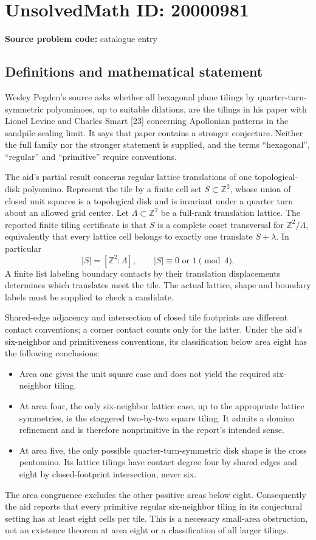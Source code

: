 \documentclass[11pt]{article}
\newcommand{\Z}{\mathbb{Z}}
\begin{document}
\section*{UnsolvedMath ID: 20000981}
\textbf{Source problem code:} catalogue entry
\subsection{Definitions and mathematical statement}
Wesley Pegden's source asks whether all hexagonal plane tilings by quarter-turn-symmetric polyominoes, up to suitable dilations, are the tilings in his paper with Lionel Levine and Charles Smart [23] concerning Apollonian patterns in the sandpile scaling limit. It says that paper contains a stronger conjecture. Neither the full family nor the stronger statement is supplied, and the terms ``hexagonal'', ``regular'' and ``primitive'' require conventions.

The aid's partial result concerns regular lattice translations of one topological-disk polyomino. Represent the tile by a finite cell set $S\subset\Z^2$, whose union of closed unit squares is a topological disk and is invariant under a quarter turn about an allowed grid center. Let $\Lambda\subset\Z^2$ be a full-rank translation lattice. The reported finite tiling certificate is that $S$ is a complete coset transversal for $\Z^2/\Lambda$, equivalently that every lattice cell belongs to exactly one translate $S+\lambda$. In particular
\[
 |S|=[\Z^2:\Lambda],\qquad |S|\equiv0\text{ or }1\pmod4.
\]
A finite list labeling boundary contacts by their translation displacements determines which translates meet the tile. The actual lattice, shape and boundary labels must be supplied to check a candidate.

Shared-edge adjacency and intersection of closed tile footprints are different contact conventions; a corner contact counts only for the latter. Under the aid's six-neighbor and primitiveness conventions, its classification below area eight has the following conclusions:
\begin{itemize}
\item Area one gives the unit square case and does not yield the required six-neighbor tiling.
\item At area four, the only six-neighbor lattice case, up to the appropriate lattice symmetries, is the staggered two-by-two square tiling. It admits a domino refinement and is therefore nonprimitive in the report's intended sense.
\item At area five, the only possible quarter-turn-symmetric disk shape is the cross pentomino. Its lattice tilings have contact degree four by shared edges and eight by closed-footprint intersection, never six.
\end{itemize}
The area congruence excludes the other positive areas below eight. Consequently the aid reports that every primitive regular six-neighbor tiling in its conjectural setting has at least eight cells per tile. This is a necessary small-area obstruction, not an existence theorem at area eight or a classification of all larger tilings.
\end{document}
